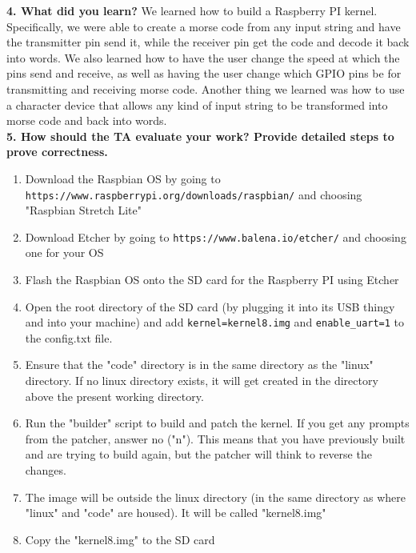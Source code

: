 \documentclass[10pt,english]{article}
\begin{document}
\noindent \textbf{4. What did you learn?}
We learned how to build a Raspberry PI kernel. Specifically, we were able to create a morse code from any input string and have the transmitter pin send it, while the receiver pin get the code and decode it back into words. We also learned how to have the user change the speed at which the pins send and receive, as well as having the user change which GPIO pins be for transmitting and receiving morse code. Another thing we learned was how to use a character device that allows any kind of input string to be transformed into morse code and back into words. \\

\noindent \textbf{5. How should the TA evaluate your work? Provide detailed steps to prove correctness.}
\begin{enumerate}
\item Download the Raspbian OS by going to \verb|https://www.raspberrypi.org/downloads/raspbian/| and choosing "Raspbian Stretch Lite"
\item Download Etcher by going to \verb|https://www.balena.io/etcher/| and choosing one for your OS
\item Flash the Raspbian OS onto the SD card for the Raspberry PI using Etcher
\item Open the root directory of the SD card (by plugging it into its USB thingy and into your machine) and add \verb|kernel=kernel8.img| and \verb|enable_uart=1| to the config.txt file.
\item Ensure that the "code" directory is in the same directory as the "linux" directory. If no linux directory exists, it will get created in the directory above the present working directory.
\item Run the "builder" script to build and patch the kernel. If you get any prompts from the patcher, answer no ("n"). This means that you have previously built and are trying to build again, but the patcher will think to reverse the changes. 
\item The image will be outside the linux directory (in the same directory as where "linux" and "code" are housed). It will be called "kernel8.img"
\item Copy the "kernel8.img" to the SD card \\
\end{enumerate}
\end{document}
